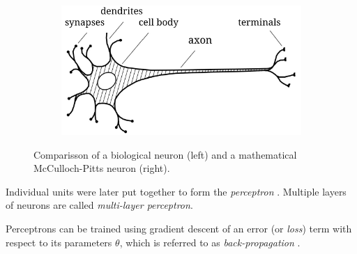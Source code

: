 \begin{figure}[ht]
    \centering
    \begin{subfigure}{0.49\textwidth}
        \centering
        \includegraphics[width=\textwidth]{assets/bio_neuron.pdf}
    \end{subfigure}
    \begin{subfigure}{0.49\textwidth}
        \centering
    \end{subfigure}
    \caption{Comparisson of a biological neuron \cite{bio-neuron} (left) and a mathematical McCulloch-Pitts neuron (right).}
    \label{fig:neuron}
\end{figure}
Individual units were later put together to form the \textit{perceptron} \cite{first-perceptron}. Multiple layers of neurons are called \textit{multi-layer perceptron}.

Perceptrons can be trained using gradient descent of an error (or \textit{loss}) term with respect to its parameters $\theta$, which is referred to as \textit{back-propagation} \cite{back-propagation}.

